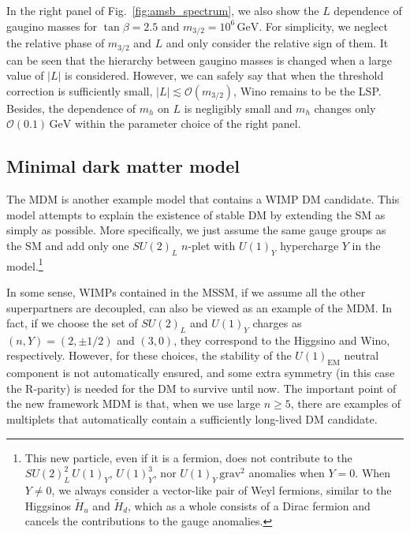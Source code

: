 \documentclass[12pt,twoside,book]{article}
\begin{document}
In the right panel of Fig.~\ref{fig:amsb_spectrum}, we also show the $L$ dependence of gaugino masses for $\tan\beta = 2.5$ and $m_{3/2} = 10^6\,\mathrm{GeV}$.
For simplicity, we neglect the relative phase of $m_{3/2}$ and $L$ and only consider the relative sign of them.
It can be seen that the hierarchy between gaugino masses is changed when a large value of $|L|$ is considered.
However, we can safely say that when the threshold correction is sufficiently small, $|L| \lesssim \mathcal{O}(m_{3/2})$, Wino remains to be the LSP.
Besides, the dependence of $m_h$ on $L$ is negligibly small and $m_h$ changes only $\mathcal{O} (0.1)\,\mathrm{GeV}$ within the parameter choice of the right panel.


\subsection{Minimal dark matter model}
\label{sec:MDM}

The MDM \cite{Cirelli:2005uq, Cirelli:2007xd, Cirelli:2009uv} is another example model that contains a WIMP DM candidate.
This model attempts to explain the existence of stable DM by extending the SM as simply as possible.
More specifically, we just assume the same gauge groups as the SM and add only one $SU(2)_L$ $n$-plet with $U(1)_Y$ hypercharge $Y$ in the model.\footnote
{
  This new particle, even if it is a fermion, does not contribute to the $SU(2)_L^2\, U(1)_Y$, $U(1)_Y^3$, nor $U(1)_Y\,\text{grav}^2$ anomalies when $Y=0$.
  When $Y \neq 0$, we always consider a vector-like pair of Weyl fermions, similar to the Higgsinos $\tilde{H}_u$ and $\tilde{H}_d$, which as a whole consists of a Dirac fermion and cancels the contributions to the gauge anomalies.
}

In some sense, WIMPs contained in the MSSM, if we assume all the other superpartners are decoupled, can also be viewed as an example of the MDM.
In fact, if we choose the set of $SU(2)_L$ and $U(1)_Y$ charges as $(n,Y) = (2,\pm 1/2)$ and $(3, 0)$, they correspond to the Higgsino and Wino, respectively.
However, for these choices, the stability of the $U(1)_{\mathrm{EM}}$ neutral component is not automatically ensured, and some extra symmetry (in this case the R-parity) is needed for the DM to survive until now.
The important point of the new framework MDM is that, when we use large $n \geq 5$, there are examples of multiplets that automatically contain a sufficiently long-lived DM candidate.
\end{document}
